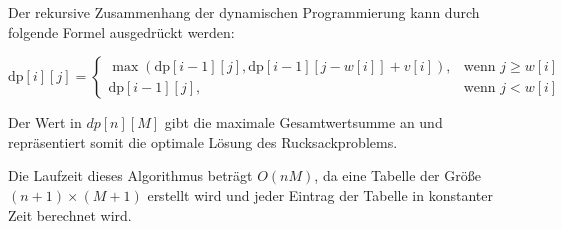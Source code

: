 Der rekursive Zusammenhang der dynamischen Programmierung 
kann durch folgende Formel ausgedrückt werden:

\begin{equation}
    \text{dp}[i][j] = \begin{cases}
        \max(\text{dp}[i-1][j], \text{dp}[i-1][j-w[i]] + v[i]), & \text{wenn } j \geq w[i] \\
        \text{dp}[i-1][j], & \text{wenn } j < w[i]
    \end{cases}
\end{equation}


Der Wert in $dp[n][M]$ gibt die maximale Gesamtwertsumme an und 
repräsentiert somit die optimale Lösung des Rucksackproblems.

Die Laufzeit dieses Algorithmus beträgt $O(nM)$, da 
eine Tabelle der Größe $(n+1) × (M+1)$ erstellt wird und 
jeder Eintrag der Tabelle in konstanter Zeit berechnet wird.\ \cite[vgl.]{Martello1987}